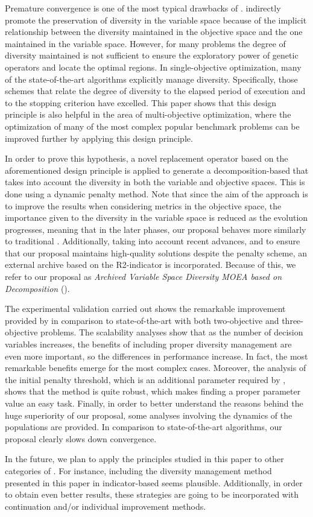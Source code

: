 Premature convergence is one of the most typical drawbacks of \EAS{}.
%
\MOEAS{} indirectly promote the preservation of diversity in the variable space
because of the implicit relationship between the diversity maintained in the objective space and the
one maintained in the variable space.
%
However, for many problems the degree of diversity maintained is not sufficient to ensure the exploratory
power of genetic operators and locate the optimal regions.
%
In single-objective optimization, many of the state-of-the-art algorithms explicitly manage
diversity.
%
Specifically, those schemes that relate the degree of diversity to the elapsed period of execution 
and to the stopping criterion
have excelled.
%
This paper shows that this design principle is also helpful in the area of multi-objective optimization,
where the optimization of many of the most complex popular benchmark problems can be improved further
by applying this design principle.

In order to prove this hypothesis, a novel replacement operator based on the aforementioned design principle
is applied to generate a decomposition-based \MOEA{} that takes into account the diversity in both the variable 
and objective spaces.
%
This is done using a dynamic penalty method. 
%
Note that since the aim of the approach is to improve the results when considering metrics in the objective space,
the importance given to the diversity in the variable space is reduced as the evolution progresses, meaning that
in the later phases, our proposal behaves more similarly to traditional \MOEAS{}.
%
Additionally, taking into account recent advances, and to ensure that our proposal maintains
high-quality solutions despite the penalty scheme, an external archive based on the
R2-indicator is incorporated.
%
Because of this, we refer to our proposal as \textit{Archived Variable Space Diversity MOEA based on Decomposition} (\AVSDMOEAD{}).

The experimental validation carried out shows the remarkable improvement provided by \AVSDMOEAD{} in comparison to
state-of-the-art \MOEAS{} with both two-objective and three-objective problems.
%
The scalability analyses show that as the number of decision variables increases, the benefits of including
proper diversity management are even more important, so the differences in performance increase.
%
In fact, the most remarkable benefits emerge for the most complex cases.
%
Moreover, the analysis of the initial penalty threshold, which is an additional parameter required by \AVSDMOEAD{}, 
shows that the method is quite robust, which makes finding a proper parameter value an easy task.
%
Finally, in order to better understand the reasons behind the huge superiority of our proposal, some analyses involving
the dynamics of the populations are provided.
%
In comparison to state-of-the-art algorithms, our proposal clearly slows down convergence.

In the future, we plan to apply the principles studied in this paper to other categories of \MOEAS{}.
%
For instance, including the diversity management method presented in this paper in indicator-based \MOEAS{} seems plausible.
%
Additionally, in order to obtain even better results, these strategies are going to be incorporated with continuation and/or individual
improvement methods.
